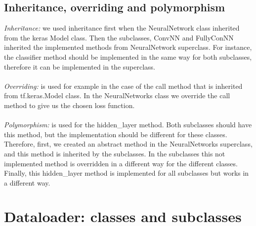 \documentclass[11pt]{article}
\begin{document}
\subsection{Inheritance, overriding and polymorphism}
\emph{Inheritance:} we used inheritance first when the NeuralNetwork class inherited from the keras Model class. Then the subclasses, ConvNN and FullyConNN inherited the implemented methods from NeuralNetwork superclass. For instance, the classifier method should be implemented in the same way for both subclasses, therefore it can be implemented in the superclass.
\\
\\
\emph{Overriding:}  is used for example in the case of the call method that is inherited from tf.keras.Model class. In the NeuralNetworks class we override the call method to give us the chosen loss function.
\\
\\
\emph{Polymorphism:}  is used for the hidden\_layer method. Both subclasses should have this method, but the implementation should be different for these classes. Therefore, first, we created an abstract method in the NeuralNetworks superclass, and this method is inherited by the subclasses. In the subclasses this not implemented method is overridden in a different way for the different classes. Finally, this hidden\_layer method is implemented for all subclasses but works in a different way.


\section{Dataloader: classes and subclasses}
\end{document}
